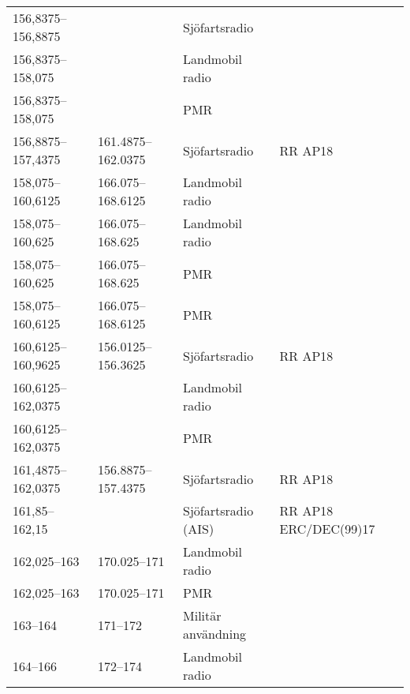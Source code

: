 \begin{landscape}
\begin{longtable}{llll}
	156,8375--156,8875                     &                    & Sjöfartsradio                         &  \\
	156,8375--158,075                      &                    & Landmobil radio                       &  \\
	156,8375--158,075                      &                    & PMR                                   &  \\
	156,8875--157,4375                     & 161.4875--162.0375 & Sjöfartsradio                         & RR AP18                        \\
	158,075--160,6125                      & 166.075--168.6125  & Landmobil radio                       &  \\
	158,075--160,625                       & 166.075--168.625   & Landmobil radio                       &  \\
	158,075--160,625                       & 166.075--168.625   & PMR                                   &  \\
	158,075--160,6125                      & 166.075--168.6125  & PMR                                   &  \\
	160,6125--160,9625                     & 156.0125--156.3625 & Sjöfartsradio                         & RR AP18                        \\
	160,6125--162,0375                     &                    & Landmobil radio                       &  \\
	160,6125--162,0375                     &                    & PMR                                   &  \\
	161,4875--162,0375                     & 156.8875--157.4375 & Sjöfartsradio                         & RR AP18                        \\
	161,85--162,15                         &                    & Sjöfartsradio (AIS)                   & RR AP18 ERC/DEC(99)17          \\
	162,025--163                           & 170.025--171       & Landmobil radio                       &  \\
	162,025--163                           & 170.025--171       & PMR                                   &  \\
	163--164                               & 171--172           & Militär användning                    &  \\
	164--166                               & 172--174           & Landmobil radio                       &  \\

\end{longtable}
\end{landscape}
